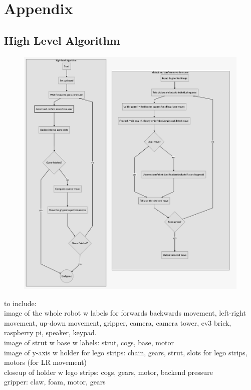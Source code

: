 \documentclass[onecolumn]{IEEEtran}
\begin{document}
\section{Appendix}

\subsection{High Level Algorithm}

\begin{figure}[h!]
  \centering
  \includegraphics[scale = .3]{white_square.png}
\end{figure}

to include:\\
image of the whole robot w labels for forwards backwards movement, left-right movement, up-down movement, gripper, camera, camera tower, ev3 brick, raspberry pi, speaker, keypad. \\
image of strut w base w labels: strut, cogs, base, motor\\
image of y-axis w holder for lego strips: chain, gears, strut, slots for lego strips, motors (for LR movement)\\
closeup of holder w lego strips: cogs, gears, motor, backend pressure\\
gripper: claw, foam, motor, gears\\
\end{document}
